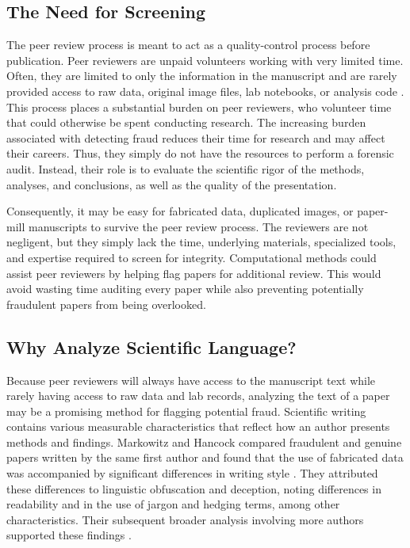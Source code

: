 \documentclass[11pt,letterpaper]{article}
\begin{document}
\subsection{The Need for Screening}

The peer review process is meant to act as a quality-control process before publication. Peer reviewers are unpaid volunteers working with very limited time. Often, they are limited to only the information in the manuscript and are rarely provided access to raw data, original image files, lab notebooks, or analysis code \cite{peer_review_materials}. This process places a substantial burden on peer reviewers, who volunteer time that could otherwise be spent conducting research. The increasing burden associated with detecting fraud reduces their time for research and may affect their careers. Thus, they simply do not have the resources to perform a forensic audit. Instead, their role is to evaluate the scientific rigor of the methods, analyses, and conclusions, as well as the quality of the presentation.

Consequently, it may be easy for fabricated data, duplicated images, or paper-mill manuscripts to survive the peer review process. The reviewers are not negligent, but they simply lack the time, underlying materials, specialized tools, and expertise required to screen for integrity. Computational methods could assist peer reviewers by helping flag papers for additional review. This would avoid wasting time auditing every paper while also preventing potentially fraudulent papers from being overlooked.

\subsection{Why Analyze Scientific Language?}

Because peer reviewers will always have access to the manuscript text while rarely having access to raw data and lab records, analyzing the text of a paper may be a promising method for flagging potential fraud. Scientific writing contains various measurable characteristics that reflect how an author presents methods and findings. Markowitz and Hancock compared fraudulent and genuine papers written by the same first author and found that the use of fabricated data was accompanied by significant differences in writing style \cite{markowitz2014}. They attributed these differences to linguistic obfuscation and deception, noting differences in readability and in the use of jargon and hedging terms, among other characteristics. Their subsequent broader analysis involving more authors supported these findings \cite{markowitz2016}.
\end{document}
